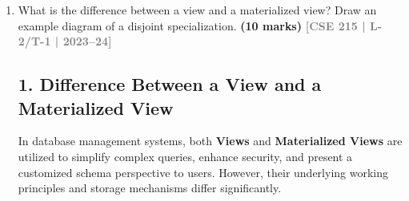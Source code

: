 \documentclass[12pt,a3paper]{article}
\newcommand{\yr}[1]{\hfill\textcolor{gray}{\small\textbf{[#1]}}}
\newcommand{\mk}[1]{\textcolor{orange!70!black}{\small\textbf{(#1 marks)}}}
\begin{document}
\begin{enumerate}
\begin{tcolorbox}[enhanced,breakable,ansbox,colback=cA!4,colframe=cA,boxrule=0.8pt,arc=5pt,title={\textbf{Answer}},fonttitle=\bfseries\color{white},colbacktitle=cA]
\subsubsection*{Schema Description for Business Rules}
To elegantly implement the limits based on the borrower classification (junior, adult, or organization), we create a \textbf{lookup schema} (reference table) that stores these constraints.

\begin{lstlisting}[language=SQL]
-- Relational Schema definition to store the business rules
CREATE TABLE Borrower_Class_Rules (
    Borrower_Class VARCHAR(20) PRIMARY KEY,
    Max_Loan_Limit INT NOT NULL,
    Loan_Period_Days INT NOT NULL
);
\end{lstlisting}

\textbf{Relational Representation:} \\
\textbf{BORROWER\_CLASS\_RULES} ( \underline{Borrower\_Class}, Max\_Loan\_Limit, Loan\_Period\_Days )

\vspace{0.5em}
\textit{\textbf{Working Principle:}} When processing a loan, the DBMS retrieves the \texttt{Loan\_Period\_Days} for the user's \texttt{Borrower\_Class} from this rule table to derive the \texttt{Return\_Date}. Simultaneously, the system compares the user's current active loans against the \texttt{Max\_Loan\_Limit} to compute the \texttt{Borrower\_Status} flag.

\end{tcolorbox}

\item What is the difference between a view and a materialized view? Draw an example diagram of a disjoint specialization.
\mk{10} \yr{CSE 215 | L-2/T-1 | 2023--24}

\begin{tcolorbox}[enhanced,breakable,ansbox,colback=cA!4,colframe=cA,boxrule=0.8pt,arc=5pt,title={\textbf{Answer}},fonttitle=\bfseries\color{white},colbacktitle=cA]

\subsection*{1. Difference Between a View and a Materialized View}

In database management systems, both \textbf{Views} and \textbf{Materialized Views} are utilized to simplify complex queries, enhance security, and present a customized schema perspective to users. However, their underlying working principles and storage mechanisms differ significantly.


\end{tcolorbox}
\end{enumerate}
\end{document}
